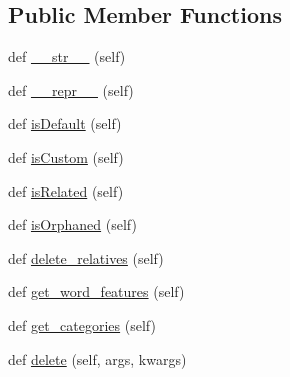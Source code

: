 \subsection*{Public Member Functions}
\begin{DoxyCompactItemize}
\item 
def \mbox{\hyperlink{classcapstoneproject_1_1models_1_1models_1_1word_1_1_word_af88bfd4c2f40177ad2dcca0df1f105b5}{\+\_\+\+\_\+str\+\_\+\+\_\+}} (self)
\item 
def \mbox{\hyperlink{classcapstoneproject_1_1models_1_1models_1_1word_1_1_word_a0023cc31fbc8ecd7badc10b6dbf28dfe}{\+\_\+\+\_\+repr\+\_\+\+\_\+}} (self)
\item 
def \mbox{\hyperlink{classcapstoneproject_1_1models_1_1models_1_1word_1_1_word_a89f963526b4f20842edea51501506e57}{is\+Default}} (self)
\item 
def \mbox{\hyperlink{classcapstoneproject_1_1models_1_1models_1_1word_1_1_word_a3a9a46943c7d9b829b0d2cf4edc91f96}{is\+Custom}} (self)
\item 
def \mbox{\hyperlink{classcapstoneproject_1_1models_1_1models_1_1word_1_1_word_a6f831976b471d46e49404bceb2e591e9}{is\+Related}} (self)
\item 
def \mbox{\hyperlink{classcapstoneproject_1_1models_1_1models_1_1word_1_1_word_a2ce1740d8a560020d9421af52f740bcd}{is\+Orphaned}} (self)
\item 
def \mbox{\hyperlink{classcapstoneproject_1_1models_1_1models_1_1word_1_1_word_ac58fb1a2a3c08e9268f571f299089084}{delete\+\_\+relatives}} (self)
\item 
def \mbox{\hyperlink{classcapstoneproject_1_1models_1_1models_1_1word_1_1_word_a341fd09dc63e4f208ac0d1fc1669e7fe}{get\+\_\+word\+\_\+features}} (self)
\item 
def \mbox{\hyperlink{classcapstoneproject_1_1models_1_1models_1_1word_1_1_word_a8ca06cbae5ad6c06c1cb4bb14e63a582}{get\+\_\+categories}} (self)
\item 
def \mbox{\hyperlink{classcapstoneproject_1_1models_1_1models_1_1word_1_1_word_a650416daf4d5819e51ade1c960193174}{delete}} (self, args, kwargs)
\end{DoxyCompactItemize}
